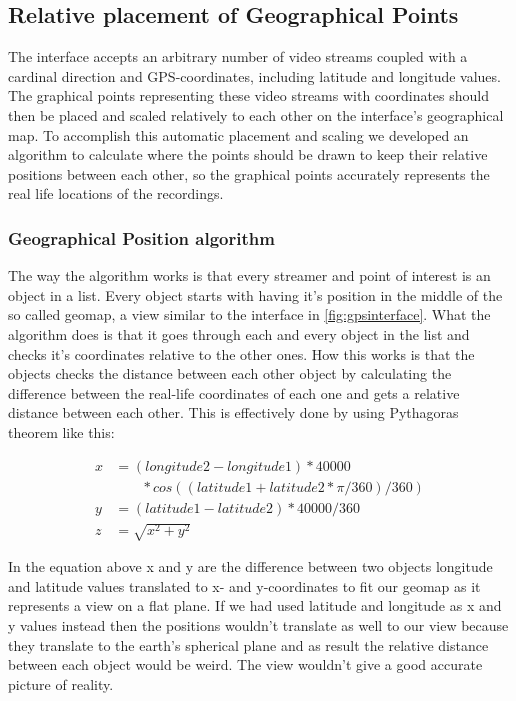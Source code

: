 \documentclass[9pt,a4paper]{acmproc}
\begin{document}
\subsection{Relative placement of Geographical Points}
The interface accepts an arbitrary number of video streams coupled with a cardinal direction and GPS-coordinates, including latitude and longitude values. The graphical points representing these video streams with coordinates should then be placed and scaled relatively to each other on the interface's geographical map. To accomplish this automatic placement and scaling we developed an algorithm to calculate where the points should be drawn to keep their relative positions between each other, so the graphical points accurately represents the real life locations of the recordings.

\subsubsection{Geographical Position algorithm}
The way the algorithm works is that every streamer and point of interest is an object in a list. Every object starts with having it's position in the middle of the so called geomap, a view similar to the interface in \ref{fig:gpsinterface}. What the algorithm does is that it goes through each and every object in the list and checks it's coordinates relative to the other ones. How this works is that the objects checks the distance between each other object by calculating the difference between the real-life coordinates of each one and gets a relative distance between each other. This is effectively done by using Pythagoras theorem like this:

\begin{align*}
x &= (longitude2-longitude1)*40000  \\
 &\phantom{b=\,} *cos((latitude1+latitude2 * \pi/360)/360) \nonumber \\
y &= (latitude1-latitude2)*40000/360 \\
z &= \sqrt{x^2+y^2}
\end{align*}

In the equation above x and y are the difference between two objects longitude and latitude values translated to x- and y-coordinates to fit our geomap as it represents a view on a flat plane. If we had used latitude and longitude as x and y values instead then the positions wouldn't translate as well to our view because they translate to the earth's spherical plane and as result the relative distance between each object would be weird. The view wouldn't give a good accurate picture of reality.
\end{document}

